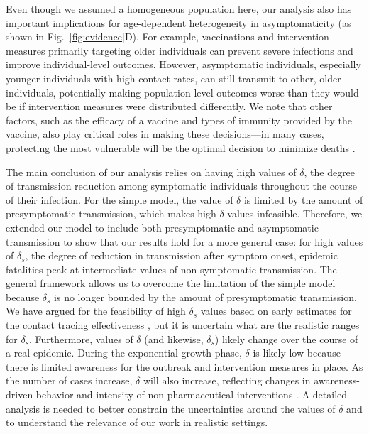 \documentclass[12pt]{article}
\newcommand{\fref}[1]{Fig.~\ref{fig:#1}}
\begin{document}
Even though we assumed a homogeneous population here, our analysis also has important implications for age-dependent heterogeneity in asymptomaticity (as shown in \fref{evidence}D).
For example, vaccinations and intervention measures primarily targeting older individuals can prevent severe infections and improve individual-level outcomes.
However, asymptomatic individuals, especially younger individuals with high contact rates, can still transmit to other, older individuals, potentially making population-level outcomes worse than they would be if intervention measures were distributed differently.
We note that other factors, such as the efficacy of a vaccine and types of immunity provided by the vaccine, also play critical roles in making these decisions---in many cases, protecting the most vulnerable will be the optimal decision to minimize deaths \cite{moore2021modelling}.

The main conclusion of our analysis relies on having high values of $\delta$, the degree of transmission reduction among symptomatic individuals throughout the course of their infection.
For the simple model, the value of $\delta$ is limited by the amount of presymptomatic transmission, which makes high $\delta$ values infeasible.
Therefore, we extended our model to include both presymptomatic and asymptomatic transmission to show that our results hold for a more general case: for high values of $\delta_s$, the degree of reduction in transmission after symptom onset, epidemic fatalities peak at intermediate values of non-symptomatic transmission.
The general framework allows us to overcome the limitation of the simple model because $\delta_s$ is no longer bounded by the amount of presymptomatic transmission.
We have argued for the feasibility of high $\delta_s$ values based on early estimates for the contact tracing effectiveness \citep{kucharski2020effectiveness}, but it is uncertain what are the realistic ranges for $\delta_s$.
Furthermore, values of $\delta$ (and likewise, $\delta_s$) likely change over the course of a real epidemic.
During the exponential growth phase, $\delta$ is likely low because there is limited awareness for the outbreak and intervention measures in place.
As the number of cases increase, $\delta$ will also increase, reflecting changes in awareness-driven behavior and intensity of non-pharmaceutical interventions \citep{weitz2020awareness}.
A detailed analysis is needed to better constrain the uncertainties around the values of $\delta$ and to understand the relevance of our work in realistic settings. 
\end{document}
